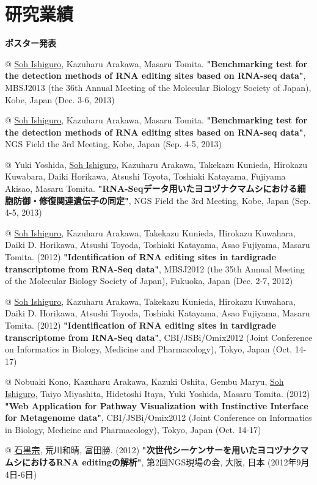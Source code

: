 \chapter*{研究業績}
\textbf{ポスター発表}

\begin{easylist}[itemize]
@ \underline{Soh Ishiguro}, Kazuharu Arakawa, Masaru Tomita. \textbf{"Benchmarking test for the detection methods of RNA editing sites based on RNA-seq data"}, MBSJ2013 (the 36th Annual Meeting of the Molecular Biology Society of Japan), Kobe, Japan (Dec. 3-6, 2013)

@ \underline{Soh Ishiguro}, Kazuharu Arakawa, Masaru Tomita. \textbf{"Benchmarking test for the detection methods of RNA editing sites based on RNA-seq data"}, NGS Field the 3rd Meeting, Kobe, Japan (Sep. 4-5, 2013)

@ Yuki Yoshida, \underline{Soh Ishiguro}, Kazuharu Arakawa, Takekazu Kunieda, Hirokazu Kuwabara, Daiki Horikawa, Atsushi Toyota, Toshiaki Katayama, Fujiyama Akisao, Masaru Tomita. \textbf{"RNA-Seqデータ用いたヨコヅナクマムシにおける細胞防御・修復関連遺伝子の同定"}, NGS Field the 3rd Meeting, Kobe, Japan (Sep. 4-5, 2013)

@ \underline{Soh Ishiguro}, Kazuharu Arakawa, Takekazu Kunieda, Hirokazu Kuwahara, Daiki D. Horikawa, Atsushi Toyoda, Toshiaki Katayama, Asao Fujiyama, Masaru Tomita. (2012) \textbf{"Identification of RNA editing sites in tardigrade transcriptome from RNA-Seq data"}, MBSJ2012 (the 35th Annual Meeting of the Molecular Biology Society of Japan), Fukuoka, Japan (Dec. 2-7, 2012)

@ \underline{Soh Ishiguro}, Kazuharu Arakawa, Takekazu Kunieda, Hirokazu Kuwahara, Daiki D. Horikawa, Atsushi Toyoda, Toshiaki Katayama, Asao Fujiyama, Masaru Tomita. (2012) \textbf{"Identification of RNA editing sites in tardigrade transcriptome from RNA-Seq data"}, CBI/JSBi/Omix2012 (Joint Conference on Informatics in Biology, Medicine and Pharmacology), Tokyo, Japan (Oct. 14-17)

@ Nobuaki Kono, Kazuharu Arakawa, Kazuki Oshita, Gembu Maryu, \underline{Soh Ishiguro}, Taiyo Miyashita, Hidetoshi Itaya, Yuki Yoshida, Masaru Tomita. (2012) \textbf{"Web Application for Pathway Visualization with Instinctive Interface for Metagenome data"}, CBI/JSBi/Omix2012 (Joint Conference on Informatics in Biology, Medicine and Pharmacology), Tokyo, Japan (Oct. 14-17)

@ \underline{石黒宗}, 荒川和晴, 冨田勝. (2012) \textbf{"次世代シーケンサーを用いたヨコヅナクマムシにおけるRNA editingの解析"}, 第2回NGS現場の会, 大阪, 日本 (2012年9月4日-6日)
\end{easylist}
